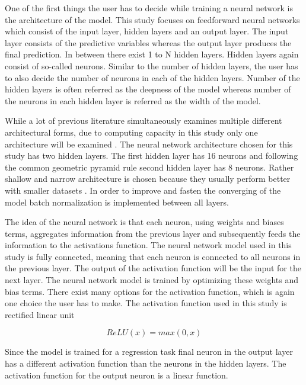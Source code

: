 \documentclass[12pt]{article}
\begin{document}
One of the first things the user has to decide while training a neural network is the architecture of the model. This study focuses on feedforward neural networks which consist of the input layer, hidden layers and an output layer. The input layer consists of the predictive variables whereas the output layer produces the final prediction. In between there exist 1 to N hidden layers. Hidden layers again consist of so-called neurons. Similar to the number of hidden layers, the user has to also decide the number of neurons in each of the hidden layers. Number of the hidden layers is often referred as the deepness of the model whereas number of the neurons in each hidden layer is referred as the width of the model. \par

While a lot of previous literature simultaneously examines multiple different architectural forms, due to computing capacity in this study only one architecture will be examined \citep{guetal, HANAUER2023, TOBEK2021100588}. The neural network architecture chosen for this study has two hidden layers. The first hidden layer has 16 neurons and following the common geometric pyramid rule second hidden layer has 8 neurons. Rather shallow and narrow architecture is chosen because they usually perform better with smaller datasets \citep{guetal}. In order to improve and fasten the converging of the model batch normalization is implemented between all layers. \par

The idea of the neural network is that each neuron, using weights and biases terms, aggregates information from the previous layer and subsequently feeds the information to the activations function. The neural network model used in this study is fully connected, meaning that each neuron is connected to all neurons in the previous layer. The output of the activation function will be the input for the next layer. The neural network model is trained by optimizing these weights and bias terms. There exist many options for the activation function, which is again one choice the user has to make. The activation function used in this study is rectified linear unit \par

\begin{equation}
\label{ReLU}
ReLU(x) = max(0, x)
\end{equation}

Since the model is trained for a regression task final neuron in the output layer has a different activation function than the neurons in the hidden layers. The activation function for the output neuron is a linear function. \par
\end{document}
